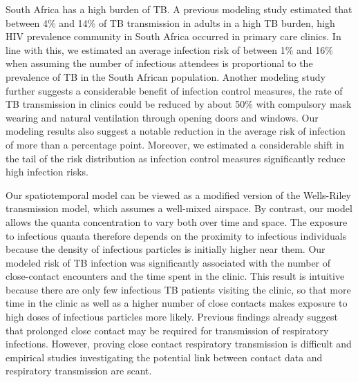 \documentclass[fleqn,11pt]{wlscirep}
\begin{document}
South Africa has a high burden of TB\cite{WHO2022TBReport}. A previous modeling study estimated that between 4\% and 14\% of TB transmission in adults in a high TB burden, high HIV prevalence community in South Africa occurred in primary care clinics\cite{McCreesh2022BMJGlobalHealth}. In line with this, we estimated an average infection risk of between 1\% and 16\% when assuming the number of infectious attendees is proportional to the prevalence of TB in the South African population. Another modeling study further suggests a considerable benefit of infection control measures, \eg the rate of TB transmission in clinics could be reduced by about 50\% with compulsory mask wearing and natural ventilation through opening doors and windows\cite{McCreesh2021BMJGlobalHealth}. Our modeling results also suggest a notable reduction in the average risk of infection of more than a percentage point. Moreover, we estimated a considerable shift in the tail of the risk distribution as infection control measures significantly reduce high infection risks.  

Our spatiotemporal model can be viewed as a modified version of the Wells-Riley transmission model\cite{Riley1978AJE}, which assumes a well-mixed airspace. By contrast, our model allows the quanta concentration to vary both over time and space. The exposure to infectious quanta therefore depends on the proximity to infectious individuals because the density of infectious particles is initially higher near them\cite{Wang2021Science,Vuorinen2020SafSci,Chen2020BuildEnv}. Our modeled risk of TB infection was significantly associated with the number of close-contact encounters and the time spent in the clinic. This result is intuitive because there are only few infectious TB patients visiting the clinic, so that more time in the clinic as well as a higher number of close contacts makes exposure to high doses of infectious particles more likely. Previous findings already suggest that prolonged close contact may be required for transmission of respiratory infections\cite{Leung2020NatMed,Brankston2007LancetID,Narasimhan2013PulmonaryMed}. However, proving close contact respiratory transmission is difficult and  empirical studies investigating the potential link between contact data and respiratory transmission are scant\cite{Voirin2015ICHE,Vanhems2013PONE}.
\end{document}
